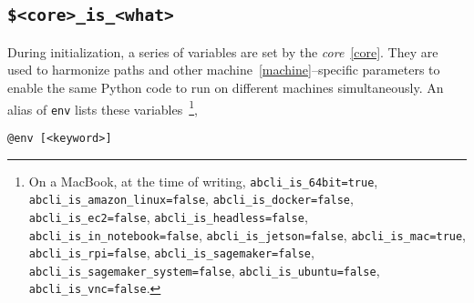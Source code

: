 \subsection{\texttt{\$<core>\_is\_<what>}}
\label{awareness}

During initialization, a series of variables are set by the \emph{core}~\ref{core}. They are used to harmonize paths and other machine~\ref{machine}--specific parameters to enable the same Python code to run on different machines simultaneously. An alias of \texttt{env} lists these variables~\footnote{On a MacBook, at the time of writing, \texttt{abcli\_is\_64bit=true}, \texttt{abcli\_is\_amazon\_linux=false}, \texttt{abcli\_is\_docker=false}, \texttt{abcli\_is\_ec2=false}, \texttt{abcli\_is\_headless=false}, \texttt{abcli\_is\_in\_notebook=false}, \texttt{abcli\_is\_jetson=false}, \texttt{abcli\_is\_mac=true}, \texttt{abcli\_is\_rpi=false}, \texttt{abcli\_is\_sagemaker=false}, \texttt{abcli\_is\_sagemaker\_system=false}, \texttt{abcli\_is\_ubuntu=false}, \texttt{abcli\_is\_vnc=false}.},
%
\begin{verbatim}
@env [<keyword>]
\end{verbatim}